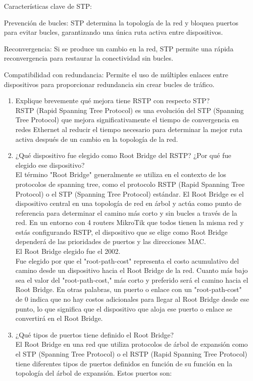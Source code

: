 \documentclass[a4paper]{article}
\begin{document}
\begin{enumerate}
Características clave de STP:

Prevención de bucles: STP determina la topología de la red y bloquea puertos para evitar bucles, garantizando una única ruta activa entre dispositivos.

Reconvergencia: Si se produce un cambio en la red, STP permite una rápida reconvergencia para restaurar la conectividad sin bucles.

Compatibilidad con redundancia: Permite el uso de múltiples enlaces entre dispositivos para proporcionar redundancia sin crear bucles de tráfico.
\begin{enumerate}
	\item Explique brevemente qué mejora tiene RSTP con respecto
	STP?
	\\
	RSTP (Rapid Spanning Tree Protocol) es una evolución del STP (Spanning Tree Protocol) que mejora significativamente el tiempo de convergencia en redes Ethernet al reducir el tiempo necesario para determinar la mejor ruta activa después de un cambio en la topología de la red.
	\item ¿Qué dispositivo fue elegido como Root Bridge del RSTP?
	¿Por qué fue elegido ese dispositivo?
	\\
	El término "Root Bridge" generalmente se utiliza en el contexto de los protocolos de spanning tree, como el protocolo RSTP (Rapid Spanning Tree Protocol) o el STP (Spanning Tree Protocol) estándar. El Root Bridge es el dispositivo central en una topología de red en árbol y actúa como punto de referencia para determinar el camino más corto y sin bucles a través de la red. En un entorno con 4 routers MikroTik que todos tienen la misma red y estás configurando RSTP, el dispositivo que se elige como Root Bridge dependerá de las prioridades de puertos y las direcciones MAC.
	\\
	El Root Bridge elegido fue el 2002. 
	\\
	Fue elegido por que el "root-path-cost" representa el costo acumulativo del camino desde un dispositivo hacia el Root Bridge de la red. Cuanto más bajo sea el valor del "root-path-cost," más corto y preferido será el camino hacia el Root Bridge. En otras palabras, un puerto o enlace con un "root-path-cost" de 0 indica que no hay costos adicionales para llegar al Root Bridge desde ese punto, lo que significa que el dispositivo que aloja ese puerto o enlace se convertirá en el Root Bridge.
	\item ¿Qué tipos de puertos tiene definido el Root Bridge?
	\\
	El Root Bridge en una red que utiliza protocolos de árbol de expansión como el STP (Spanning Tree Protocol) o el RSTP (Rapid Spanning Tree Protocol) tiene diferentes tipos de puertos definidos en función de su función en la topología del árbol de expansión. Estos puertos son:
	

\end{enumerate}
\end{enumerate}
\end{document}
